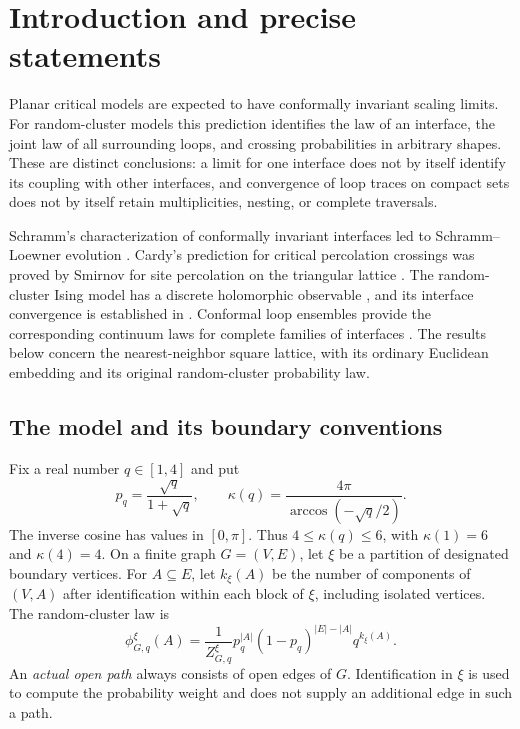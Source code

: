 \section{Introduction and precise statements}\label{sec:introduction}

Planar critical models are expected to have conformally invariant scaling
limits.  For random-cluster models this prediction identifies the law of an
interface, the joint law of all surrounding loops, and crossing
probabilities in arbitrary shapes.  These are distinct conclusions: a
limit for one interface does not by itself identify its coupling with
other interfaces, and convergence of loop traces on compact sets does not
by itself retain multiplicities, nesting, or complete traversals.

Schramm's characterization of conformally invariant interfaces led to
Schramm--Loewner evolution \citep{Schramm2000}.  Cardy's prediction for
critical percolation crossings \citep{Cardy1992} was proved by Smirnov for
site percolation on the triangular lattice \citep{Smirnov2001}.  The
random-cluster Ising model has a discrete holomorphic observable
\citep{Smirnov2010}, and its interface convergence is established in
\citet{ChelkakDCHonglerKemppainenSmirnov2014}.  Conformal loop ensembles
provide the corresponding continuum laws for complete families of
interfaces \citep{SheffieldWerner2012,Sheffield2009Exploration}.
The results below concern the nearest-neighbor square lattice, with its
ordinary Euclidean embedding and its original random-cluster probability
law.

\subsection{The model and its boundary conventions}
\label{intro:model}

Fix a real number $q\in[1,4]$ and put
\begin{equation}\label{intro:parameters}
 p_q=\frac{\sqrt q}{1+\sqrt q},
 \qquad
 \kappa(q)=\frac{4\pi}{\arccos(-\sqrt q/2)}.
\end{equation}
The inverse cosine has values in $[0,\pi]$.  Thus $4\le\kappa(q)\le6$,
with $\kappa(1)=6$ and $\kappa(4)=4$.  On a finite graph $G=(V,E)$,
let $\xi$ be a partition of designated boundary vertices.  For
$A\subseteq E$, let $k_\xi(A)$ be the number of components of $(V,A)$
after identification within each block of $\xi$, including isolated
vertices.  The random-cluster law is
\begin{equation}\label{intro:finite-law}
 \phi_{G,q}^{\xi}(A)
 =\frac{1}{Z_{G,q}^{\xi}}
 p_q^{|A|}(1-p_q)^{|E|-|A|}q^{k_\xi(A)}.
\end{equation}
An \emph{actual open path} always consists of open edges of $G$.
Identification in $\xi$ is used to compute the probability weight and
does not supply an additional edge in such a path.

